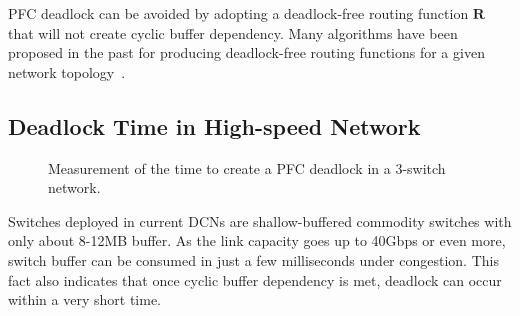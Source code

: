 PFC deadlock can be avoided by adopting a deadlock-free routing function $\textbf{R}$ that will not create cyclic buffer dependency. Many algorithms have been proposed in the past for producing deadlock-free routing functions for a given network topology~\cite{dally,flich2012survey,tcp-bolt}.

%

\subsection{Deadlock Time in High-speed Network}\label{subsec:deadlocktime}

\begin{figure}[t]
	\centering
	
	\caption{Measurement of the time to create a PFC deadlock in a 3-switch network.}\label{fig:deadlocktime}
	\vspace{-0.2in}
\end{figure}

Switches deployed in current DCNs are shallow-buffered commodity switches with only about 8-12MB buffer. As the link capacity goes up to 40Gbps or even more,  switch buffer can be consumed in just a few milliseconds under congestion. This fact also indicates that once cyclic buffer dependency is met, deadlock can occur within a very short time.

